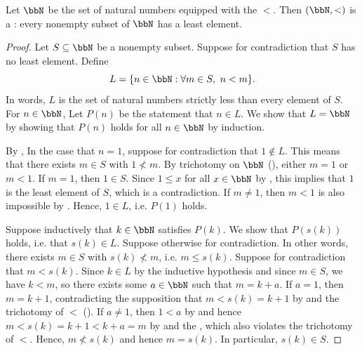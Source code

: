 \begin{proposition} \label{proposition:natural_numbers_well_ordered}
Let $\bbN$ be the set of natural numbers equipped with the  $<$. Then $(\bbN, <)$ is a : every nonempty subset of $\bbN$ has a least element.
\end{proposition}

\begin{proof}
Let $S \subseteq \bbN$ be a nonempty subset. Suppose for contradiction that $S$ has no least element. Define
$$L = \{n \in \bbN : \forall m \in S, \ n < m\}.$$
In words, $L$ is the set of natural numbers strictly less than every element of $S$. For $n \in \bbN$, Let $P(n)$ be the statement that $n \in L$. We show that $L = \bbN$ by showing that $P(n)$ holds for all $n \in \bbN$ by induction.

By , 
In the case that $n = 1$, suppose for contradiction that $1 \not\in L$. This means that there exists $m \in S$ with $1 \not< m$. By trichotomy on $\bbN$ (), either $m = 1$ or $m < 1$. If $m = 1$, then $1 \in S$. Since $1 \leq x$ for all $x \in \bbN$ by , this implies that $1$ is the least element of $S$, which is a contradiction. If $m \neq 1$, then $m < 1$ is also impossible by . Hence, $1 \in L$, i.e. $P(1)$ holds. 

Suppose inductively that $k \in \bbN$ satisfies $P(k)$. We show that $P(s(k))$ holds, i.e. that $s(k) \in L$. Suppose otherwise for contradiction. In other words, there exists $m \in S$ with $s(k) \not< m$, i.e. $m \leq s(k)$. Suppose for contradiction that $m < s(k)$. Since $k \in L$ by the inductive hypothesis and since $m \in S$, we have $k < m$, so there exists some $a \in \bbN$ such that $m = k+a$. If $a = 1$, then $m = k+1$, contradicting the supposition that $m < s(k) = k+1$ by  and the trichotomy of $<$ (). If $a \neq 1$, then $1 < a$ by  and hence $m < s(k) = k+1 < k+a = m$ by  and the , which also violates the trichotomy of $<$. Hence, $m \not< s(k)$ and hence $m = s(k)$. In particular, $s(k) \in S$.


\end{proof}
